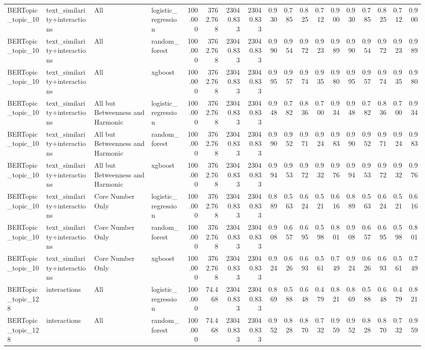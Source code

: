 \begin{tabular}{llllrrrrrrrrrrrrrr}
BERTopic_topic_10 & text_similarity+interactions & All & logistic_regression & 100.000 & 3762.768 & 23040.833 & 23040.833 & 0.930 & 0.785 & 0.825 & 0.712 & 0.900 & 0.930 & 0.785 & 0.825 & 0.712 & 0.900 \\
BERTopic_topic_10 & text_similarity+interactions & All & random_forest & 100.000 & 3762.768 & 23040.833 & 23040.833 & 0.990 & 0.954 & 0.972 & 0.923 & 0.989 & 0.990 & 0.954 & 0.972 & 0.923 & 0.989 \\
BERTopic_topic_10 & text_similarity+interactions & All & xgboost & 100.000 & 3762.768 & 23040.833 & 23040.833 & 0.995 & 0.957 & 0.974 & 0.935 & 0.980 & 0.995 & 0.957 & 0.974 & 0.935 & 0.980 \\
BERTopic_topic_10 & text_similarity+interactions & All but Betweenness and Harmonic & logistic_regression & 100.000 & 3762.768 & 23040.833 & 23040.833 & 0.948 & 0.782 & 0.836 & 0.700 & 0.934 & 0.948 & 0.782 & 0.836 & 0.700 & 0.934 \\
BERTopic_topic_10 & text_similarity+interactions & All but Betweenness and Harmonic & random_forest & 100.000 & 3762.768 & 23040.833 & 23040.833 & 0.990 & 0.952 & 0.971 & 0.924 & 0.983 & 0.990 & 0.952 & 0.971 & 0.924 & 0.983 \\
BERTopic_topic_10 & text_similarity+interactions & All but Betweenness and Harmonic & xgboost & 100.000 & 3762.768 & 23040.833 & 23040.833 & 0.994 & 0.953 & 0.972 & 0.932 & 0.976 & 0.994 & 0.953 & 0.972 & 0.932 & 0.976 \\
BERTopic_topic_10 & text_similarity+interactions & Core Number Only & logistic_regression & 100.000 & 3762.768 & 23040.833 & 23040.833 & 0.889 & 0.563 & 0.624 & 0.521 & 0.616 & 0.889 & 0.563 & 0.624 & 0.521 & 0.616 \\
BERTopic_topic_10 & text_similarity+interactions & Core Number Only & random_forest & 100.000 & 3762.768 & 23040.833 & 23040.833 & 0.908 & 0.657 & 0.695 & 0.598 & 0.801 & 0.908 & 0.657 & 0.695 & 0.598 & 0.801 \\
BERTopic_topic_10 & text_similarity+interactions & Core Number Only & xgboost & 100.000 & 3762.768 & 23040.833 & 23040.833 & 0.924 & 0.626 & 0.693 & 0.561 & 0.749 & 0.924 & 0.626 & 0.693 & 0.561 & 0.749 \\
BERTopic_topic_128 & interactions & All & logistic_regression & 100.000 & 74.468 & 23040.833 & 23040.833 & 0.869 & 0.588 & 0.648 & 0.479 & 0.821 & 0.869 & 0.588 & 0.648 & 0.479 & 0.821 \\
BERTopic_topic_128 & interactions & All & random_forest & 100.000 & 74.468 & 23040.833 & 23040.833 & 0.952 & 0.828 & 0.870 & 0.732 & 0.959 & 0.952 & 0.828 & 0.870 & 0.732 & 0.959 \\

\end{tabular}
